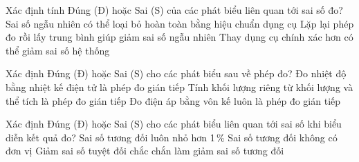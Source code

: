 \begin{ex}
	Xác định tính Đúng (Đ) hoặc Sai (S) của các phát biểu liên quan tới sai số đo?
	{Sai số ngẫu nhiên có thể loại bỏ hoàn toàn bằng hiệu chuẩn dụng cụ}
	{\True Lặp lại phép đo rồi lấy trung bình giúp giảm sai số ngẫu nhiên}
	{Thay dụng cụ chính xác hơn có thể giảm sai số hệ thống}
\end{ex}

\begin{ex}
	Xác định Đúng (Đ) hoặc Sai (S) cho các phát biểu sau về phép đo?
	{Đo nhiệt độ bằng nhiệt kế điện tử là phép đo gián tiếp}
	{\True Tính khối lượng riêng từ khối lượng và thể tích là phép đo gián tiếp}
	{Đo điện áp bằng vôn kế luôn là phép đo gián tiếp}
\end{ex}

\begin{ex}
	Xác định Đúng (Đ) hoặc Sai (S) cho các phát biểu liên quan tới sai số khi biểu diễn kết quả đo?
	{Sai số tương đối luôn nhỏ hơn 1\,\%}
	{\True Sai số tương đối không có đơn vị}
	{Giảm sai số tuyệt đối chắc chắn làm giảm sai số tương đối}
\end{ex}

